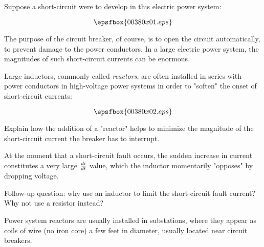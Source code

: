 

Suppose a short-circuit were to develop in this electric power system:

$$\epsfbox{00380x01.eps}$$

The purpose of the circuit breaker, of course, is to open the circuit automatically, to prevent damage to the power conductors.  In a large electric power system, the magnitudes of such short-circuit currents can be enormous.

Large inductors, commonly called {\it reactors}, are often installed in series with power conductors in high-voltage power systems in order to "soften" the onset of short-circuit currents:

$$\epsfbox{00380x02.eps}$$

Explain how the addition of a "reactor" helps to minimize the magnitude of the short-circuit current the breaker has to interrupt.







At the moment that a short-circuit fault occurs, the sudden increase in current constitutes a very large ${di \over dt}$ value, which the inductor momentarily "opposes" by dropping voltage.

\vskip 10pt

Follow-up question: why use an inductor to limit the short-circuit fault current?  Why not use a resistor instead?







Power system reactors are usually installed in substations, where they appear as coils of wire (no iron core) a few feet in diameter, usually located near circuit breakers.




